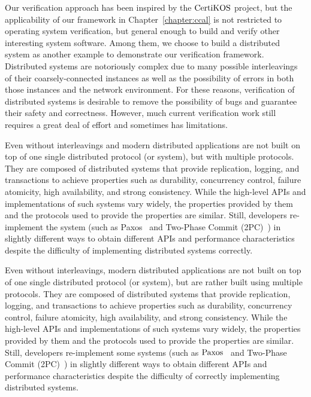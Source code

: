 
Our verification approach has been inspired by the $\mathrm{CertiKOS}$ project,
but the applicability of our framework in Chapter~\ref{chapter:ccal} is not restricted to operating system verification, but general enough
to build and verify other interesting system software. 
Among them, we choose to build a distributed system as another example to demonstrate our 
verification framework.
Distributed systems are notoriously complex due to  many possible interleavings of their coarsely-connected 
instances as well as the possibility of errors in both those instances and the network environment. 
For these reasons, verification of distributed systems is desirable to remove the possibility of bugs and guarantee their safety and correctness. 
However, much current verification work still requires a great deal of effort and sometimes has limitations.



Even without interleavings and%
modern distributed applications are not built on top of one single distributed protocol (or system), but with multiple protocols.
They are composed of distributed systems that provide replication, 
logging, and transactions to achieve properties such as durability, concurrency control, failure atomicity, high availability, and strong consistency.
While the high-level APIs and implementations of such systems vary widely, 
the properties provided by them and the protocols used to provide the properties are similar. 
Still, developers re-implement the system (such as Paxos~\cite{paxos} and 
Two-Phase Commit (2PC)~\cite{2PC}) in slightly different ways to obtain different APIs and performance 
characteristics despite the difficulty of implementing distributed systems correctly.


Even without interleavings, modern distributed applications are not built on top of one single distributed protocol (or system),
 but are rather built using multiple protocols. They are composed of distributed systems that provide replication, logging, and transactions to achieve properties such as durability, concurrency control, failure atomicity, high availability, and strong consistency. 
 While the high-level APIs and implementations of such systems vary widely, the properties provided by them and the protocols used to provide the properties are similar. Still, developers re-implement some systems (such as $\mathrm{Paxos}$~\cite{paxos} and 
Two-Phase Commit (2PC)~\cite{2PC}) in slightly different ways to obtain different APIs and performance characteristics despite the difficulty of correctly implementing distributed systems.



